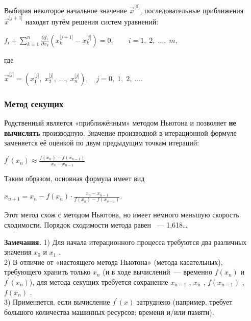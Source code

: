 \documentclass[a4paper]{article}
\begin{document}
{{{{{{{{Выбирая некоторое начальное значение {\({\overset{\rightarrow}{x}}^{\lbrack 0\rbrack}\)},
последовательные приближения {\({\overset{\rightarrow}{x}}^{\lbrack j + 1\rbrack}\)}
находят путём решения систем уравнений:

\begin{center}
 {\(f_{i} + \sum\limits_{k = 1}^{n}\frac{\partial f_{i}}{\partial x_{k}}(x_{k}^{\lbrack j + 1\rbrack} - x_{k}^{\lbrack j\rbrack}) = 0,\qquad i = 1,\; 2,\;\ldots,\; m,\)}
\end{center}

где

\begin{center}
 {\({\overset{\rightarrow}{x}}^{\lbrack j\rbrack} = (x_{1}^{\lbrack j\rbrack},\; x_{2}^{\lbrack j\rbrack},\;\ldots,\; x_{n}^{\lbrack j\rbrack}),\quad j = 0,\; 1,\; 2,\;\ldots\)}.
\end{center}

\subsubsection{Метод секущих}

Родственный является «приближённым» методом Ньютона и позволяет
\textbf{не вычислять} производную. Значение производной в итерационной
формуле заменяется её оценкой по двум предыдущим точкам итераций:

\begin{center}
 {{\(f^{\prime}(x_{n}) \approx \frac{f(x_{n}) - f(x_{n - 1})}{x_{n} - x_{n - 1}}\)}}
\end{center}

Таким образом, основная формула имеет вид
\begin{center}
 {{\(x_{n + 1} = x_{n} - f(x_{n}) \cdot \frac{x_{n} - x_{n - 1}}{f(x_{n}) - f(x_{n - 1})}.\)}}
\end{center}

Этот метод схож с методом Ньютона, но имеет немного меньшую скорость
сходимости. Порядок сходимости метода равен ~--- 1,618\ldots{}

\textbf{Замечания.} 1) Для начала итерационного процесса требуются два
различных значения {{\(x_{0}\)}} и {{\(x_{1}\)}} .\\
2) В отличие от «настоящего метода Ньютона» (метода касательных),
требующего хранить только {{\(x_{n}\)}} (и в ходе вычислений~---
временно {{\(f(x_{n})\)}} и {{\(f^{\prime}(x_{n})\)}}), для метода
секущих требуется сохранение {{\(x_{n - 1}\)}} , {{\(x_{n}\)}} ,
{{\(f(x_{n - 1})\)}} , {{\(f(x_{n})\)}} .\\
3) Применяется, если вычисление {{\(f^{\prime}(x)\)}} затруднено
(например, требует большого количества машинных ресурсов: времени и/или
памяти).

}}}}}}}}
\end{document}
